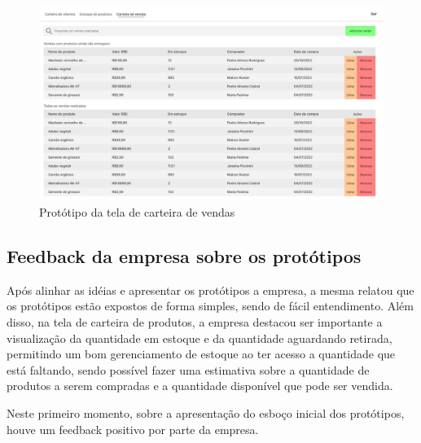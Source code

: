 \documentclass[serif, english, brazilian, oneside]{uffstex}
\begin{document}
\begin{figure}[!htpb]
    \centering
    \caption{Protótipo da tela de carteira de vendas}
    \label{fig:prototipo_carteira_vendas}
    \includegraphics[width=\linewidth]{imagens/prototipo_carteira_vendas.jpeg}
\end{figure}

\newpage

\subsection{Feedback da empresa sobre os protótipos}

Após alinhar as idéias e apresentar os protótipos a empresa, a mesma relatou que os protótipos estão expostos de forma simples, sendo de fácil entendimento. Além disso, na tela de carteira de produtos, a empresa destacou ser importante a visualização da quantidade em estoque e da quantidade aguardando retirada, permitindo um bom gerenciamento de estoque ao ter acesso a quantidade que está faltando, sendo possível fazer uma estimativa sobre a quantidade de produtos a serem compradas e a quantidade disponível que pode ser vendida.

Neste primeiro momento, sobre a apresentação do esboço inicial dos protótipos, houve um feedback positivo por parte da empresa.

\printbibliography[heading=abnt]
\end{document}
